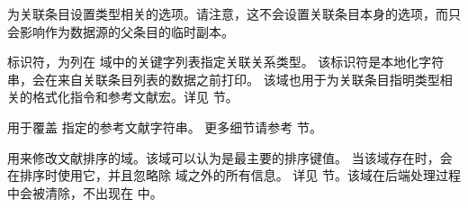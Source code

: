 \begin{fieldlist}
为关联条目设置类型相关的选项。请注意，这不会设置关联条目本身的选项，而只会影响作为数据源的父条目的临时副本。




标识符，为列在  域中的关键字列表指定关联关系类型。
该标识符是本地化字符串，会在来自关联条目列表的数据之前打印。
该域也用于为关联条目指明类型相关的格式化指令和参考文献宏。详见  节。




用于覆盖  指定的参考文献字符串。
更多细节请参考  节。




用来修改文献排序的域。该域可以认为是最主要的排序键值。
当该域存在时，\biblatex 会在排序时使用它，并且忽略除  域之外的所有信息。
详见  节。该域在后端处理过程中会被清除，不出现在  中。




\end{fieldlist}
